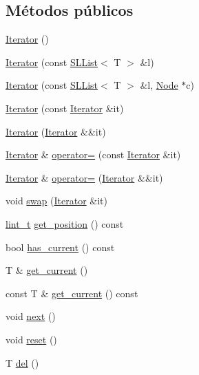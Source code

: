 \subsection*{Métodos públicos}
\begin{DoxyCompactItemize}
\item 
\hyperlink{class_designar_1_1_s_l_list_1_1_iterator_a8c1c1f8110e22d81401e404c53003156}{Iterator} ()
\item 
\hyperlink{class_designar_1_1_s_l_list_1_1_iterator_a280b63ef5b720adb076806270cd9e8ec}{Iterator} (const \hyperlink{class_designar_1_1_s_l_list}{S\+L\+List}$<$ T $>$ \&l)
\item 
\hyperlink{class_designar_1_1_s_l_list_1_1_iterator_a56a2a893f109ea2158b183c3efaff8a3}{Iterator} (const \hyperlink{class_designar_1_1_s_l_list}{S\+L\+List}$<$ T $>$ \&l, \hyperlink{class_designar_1_1_node_s_l_list_a41963019ada1025099e3259207a3de96}{Node} $\ast$c)
\item 
\hyperlink{class_designar_1_1_s_l_list_1_1_iterator_ae6726c755567d34649157c075b825a20}{Iterator} (const \hyperlink{class_designar_1_1_s_l_list_1_1_iterator}{Iterator} \&it)
\item 
\hyperlink{class_designar_1_1_s_l_list_1_1_iterator_a2d8fece759af352a51982b4ffb25f351}{Iterator} (\hyperlink{class_designar_1_1_s_l_list_1_1_iterator}{Iterator} \&\&it)
\item 
\hyperlink{class_designar_1_1_s_l_list_1_1_iterator}{Iterator} \& \hyperlink{class_designar_1_1_s_l_list_1_1_iterator_ab6a8bedc6dc57d1255464d4ea942bdf5}{operator=} (const \hyperlink{class_designar_1_1_s_l_list_1_1_iterator}{Iterator} \&it)
\item 
\hyperlink{class_designar_1_1_s_l_list_1_1_iterator}{Iterator} \& \hyperlink{class_designar_1_1_s_l_list_1_1_iterator_a9215becbdd87b11db7f6481e96df9343}{operator=} (\hyperlink{class_designar_1_1_s_l_list_1_1_iterator}{Iterator} \&\&it)
\item 
void \hyperlink{class_designar_1_1_s_l_list_1_1_iterator_afbb40762fe2a3c8ecea8fb26751492e0}{swap} (\hyperlink{class_designar_1_1_s_l_list_1_1_iterator}{Iterator} \&it)
\item 
\hyperlink{namespace_designar_a9d113d66a39e82b73727c72cd3a52f73}{lint\+\_\+t} \hyperlink{class_designar_1_1_s_l_list_1_1_iterator_a2105a92f98b381c1dc9cdc138e96a22a}{get\+\_\+position} () const
\item 
bool \hyperlink{class_designar_1_1_s_l_list_1_1_iterator_ab245268535b61d073d615dc969bcaf5a}{has\+\_\+current} () const
\item 
T \& \hyperlink{class_designar_1_1_s_l_list_1_1_iterator_a4986f4352424c32e5518ce1435474f0b}{get\+\_\+current} ()
\item 
const T \& \hyperlink{class_designar_1_1_s_l_list_1_1_iterator_aa29dad95637eeaf662bcc3a8bb02d77a}{get\+\_\+current} () const
\item 
void \hyperlink{class_designar_1_1_s_l_list_1_1_iterator_a37eb6d2f01ce3e41785512742cab0fbc}{next} ()
\item 
void \hyperlink{class_designar_1_1_s_l_list_1_1_iterator_adb490da387d9628b7b61217247e96d97}{reset} ()
\item 
T \hyperlink{class_designar_1_1_s_l_list_1_1_iterator_ae9fc8898009213695804526b4fe8c2cb}{del} ()
\end{DoxyCompactItemize}
